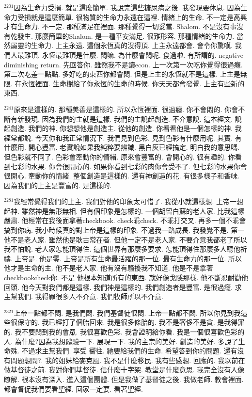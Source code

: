\documentclass{book}
\begin{document}
$^{2201}$因為生命力受損.
就是這麼簡單.
我說完這些糖尿病之後.
我發現要休息.
因為生命力受損就是這麼簡單.
很物質的生命力永遠在這裡.
情緒上的生命.
不一定是高興才有生命力.
不一定.
那種滿足在裡面.
那種覺得一切妥當.
Shalom.
不是沒有事沒有乾發生.
那麼簡單的Shalom.
是一種平安滿足.
很難形容.
那種情緒的生命力.
當然屬靈的生命力.
上主永遠.
這個永恆真的沒得頂.
上主永遠都會.
會令你驚嘆.
我們人最難頂.
永恆最難頂是什麼.
悶嘛.
為什麼會悶呢.
食過啦.
有所謂的.
negative diminishing return.
先回答你.
雖然我不是讀econ.
上一次第一次吃你覺得很過癮.
第二次吃差一點點.
多好吃的東西你都會悶.
但是上主的永恆就不是這樣.
上主是無限.
在永恆裡面.
生命樹給了你永恆的生命的時候.
你天天都會發覺.
上主有些新的東西.

$^{2241}$原來是這樣的.
那種美善是這樣的.
所以永恆裡面.
很過癮.
你不會悶的.
你會不斷有新發現.
因為我們的主就是這樣.
我們的主說起創造.
不介意說.
這本經文.
說起創造.
我們的神.
你想想他是創造主.
從他的創造.
你看看他是一個怎樣的神.
我經常都說.
今天你和我正常情況下.
我們見到色彩.
見到色彩有什麼用呢.
其實.
有什麼用.
開心豐富.
老實說如果我純粹要辨識.
黑白灰已經搞定.
明白我的意思嗎.
但色彩就不同了.
色彩會牽動你的情緒.
原來會豐富的.
會開心的.
很有趣的.
你看到七彩的水果.
你會很開心的.
如果你看到七彩的肉你會受不了.
但七彩的水果你會很開心.
牽動你的情緒.
整個創造是這樣的.
還有神創造的花.
有很多樣子和香味.
因為我們的上主是豐富的.
是這樣的.

$^{2281}$我經常覺得我們的上主.
我們對他的印象太可惜了.
我從小就這樣想.
上帝一想起神.
雖然神是無形無相.
但有個印象是怎樣的.
一個胡留白蘇的老人家.
比我這樣嚴肅.
他經常在我後面拿著checkbook.
check乖check.
不乖打交叉.
再多一個不乖會搞到你病.
我小時候真的對上帝是這樣的印象.
不過我一路成長.
我發覺不是.
第一他不是老人家.
雖然他是耿古常在者.
但他一定不是老人家.
不要介意我都老了所以我不怕說.
老人家怎能頂得住.
這個世界有那麼多要求.
怎能頂得住那麼多人聽他祈禱.
上帝是.
他是零.
上帝是所有生命最活躍的那一位.
最有生命力的那一位.
所以他才是生命的主.
他不是老人家.
他有沒有騷擾我不知道.
他是不是拿著checkbookcheck你.
不是 他根本知道所有的東西.
就好像戈隱那樣.
他不斷忍耐勸他回頭.
他今天對我們都是這樣.
我們神是這樣的.
我們創造者是豐富.
是很過癮.
求主幫我們.
我得罪很多人不介意.
我們牧師所以不介意.

$^{2321}$上帝一點都不悶.
是我們悶.
我們基督徒很悶.
上帝一點都不悶.
所以你見到我這些很保守的.
我已經打了個胎回來.
我是很多條胎的.
我不是奢侈不是貪.
是我得罪的.
我不要悶到我的會眾.
我很喜歡色彩.
我會證明給你看.
我是一個很喜歡色彩的人.
為什麼?因為我想體驗一下.
展現一下.
我的主宗的美好.
創造的美好.
多說了生命殊.
不過求主幫我們.
享受 嚮往.
祂要給我們的生命.
希望答到你的問題.
還有沒有問題想問?.
我的姐妹給麥克風.
我不是什麼移民.
我有些感想.
回應的.
我以前在做基督徒之前.
我對你們基督徒.
信什麼十字架.
教堂是什麼意思.
我完全沒有人像瞭解.
根本沒有深入.
進入這個團體.
但是我做了基督徒之後.
我做老師.
教會裡面.
都會督促我們要看聖經.
回家一定要.
看著聖經.
\end{document}
